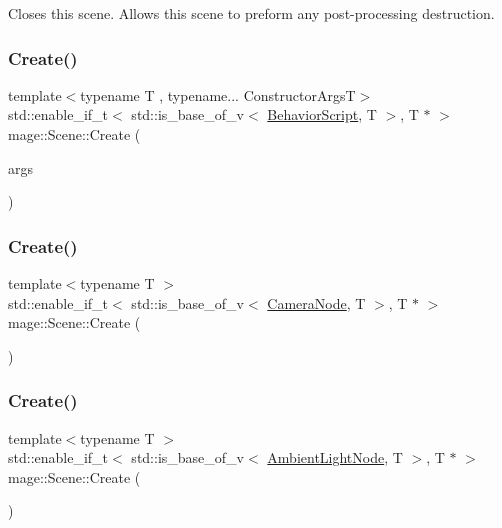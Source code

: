 Closes this scene. Allows this scene to preform any post-\/processing destruction. \hypertarget{classmage_1_1_scene_af4dbd3e1808b8e4db2c9c8f39eb151b7}{}\label{classmage_1_1_scene_af4dbd3e1808b8e4db2c9c8f39eb151b7} 
\subsubsection{\texorpdfstring{Create()}{Create()}\hspace{0.1cm}{\footnotesize\ttfamily [1/7]}}
{\footnotesize\ttfamily template$<$typename T , typename... Constructor\+ArgsT$>$ \\
std\+::enable\+\_\+if\+\_\+t$<$ std\+::is\+\_\+base\+\_\+of\+\_\+v$<$ \hyperlink{classmage_1_1_behavior_script}{Behavior\+Script}, T $>$, T $\ast$ $>$ mage\+::\+Scene\+::\+Create (\begin{DoxyParamCaption}\item[{Constructor\+ArgsT \&\&...}]{args }\end{DoxyParamCaption})}

\hypertarget{classmage_1_1_scene_aea0d599366090f046bf9221b8bbfd1a4}{}\label{classmage_1_1_scene_aea0d599366090f046bf9221b8bbfd1a4} 
\subsubsection{\texorpdfstring{Create()}{Create()}\hspace{0.1cm}{\footnotesize\ttfamily [2/7]}}
{\footnotesize\ttfamily template$<$typename T $>$ \\
std\+::enable\+\_\+if\+\_\+t$<$ std\+::is\+\_\+base\+\_\+of\+\_\+v$<$ \hyperlink{classmage_1_1_camera_node}{Camera\+Node}, T $>$, T $\ast$ $>$ mage\+::\+Scene\+::\+Create (\begin{DoxyParamCaption}{ }\end{DoxyParamCaption})}

\hypertarget{classmage_1_1_scene_a81aa10e5468629e683500e59cb5082da}{}\label{classmage_1_1_scene_a81aa10e5468629e683500e59cb5082da} 
\subsubsection{\texorpdfstring{Create()}{Create()}\hspace{0.1cm}{\footnotesize\ttfamily [3/7]}}
{\footnotesize\ttfamily template$<$typename T $>$ \\
std\+::enable\+\_\+if\+\_\+t$<$ std\+::is\+\_\+base\+\_\+of\+\_\+v$<$ \hyperlink{namespacemage_ab0783a7428706251f8561dc30a4d228d}{Ambient\+Light\+Node}, T $>$, T $\ast$ $>$ mage\+::\+Scene\+::\+Create (\begin{DoxyParamCaption}{ }\end{DoxyParamCaption})}

